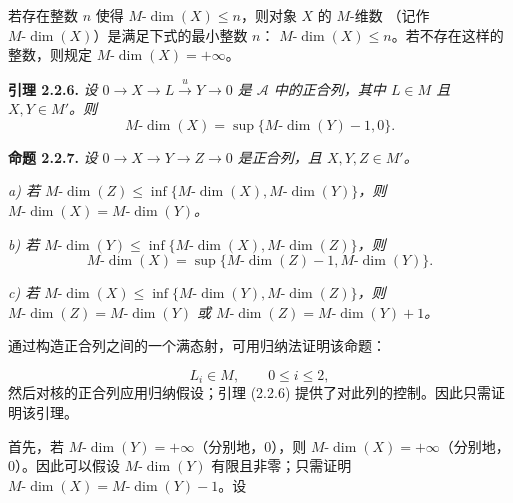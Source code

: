\clearpage
{}%
\begingroup\small\setlength{\parskip}{0pt}\setlength{\emergencystretch}{1.5em}
\setlength{\abovedisplayskip}{4pt plus 2pt minus 2pt}%
\setlength{\belowdisplayskip}{4pt plus 2pt minus 2pt}%

若存在整数 $n$ 使得 $M\text{-}\dim(X)\leq n$，则对象 $X$ 的 $M$-维数
（记作 $M\text{-}\dim(X)$）是满足下式的最小整数 $n$：
$M\text{-}\dim(X)\leq n$。若不存在这样的整数，则规定
$M\text{-}\dim(X)=+\infty$。

\medskip\noindent\textbf{引理 2.2.6.}\quad
\textit{设
$0\longrightarrow X\longrightarrow L\xrightarrow{u}Y\longrightarrow0$
是 $\mathcal A$ 中的正合列，其中 $L\in M$ 且 $X,Y\in M'$。则}
\[
M\text{-}\dim(X)=\sup\{M\text{-}\dim(Y)-1,0\}.
\]

\medskip\noindent\textbf{命题 2.2.7.}\quad
\textit{设
$0\longrightarrow X\longrightarrow Y\longrightarrow Z\longrightarrow0$
是正合列，且 $X,Y,Z\in M'$。}

\noindent\textit{a) 若
$M\text{-}\dim(Z)\leq
\inf\{M\text{-}\dim(X),M\text{-}\dim(Y)\}$，则
$M\text{-}\dim(X)=M\text{-}\dim(Y)$。}

\noindent\textit{b) 若
$M\text{-}\dim(Y)\leq
\inf\{M\text{-}\dim(X),M\text{-}\dim(Z)\}$，则}
\[
M\text{-}\dim(X)=
\sup\{M\text{-}\dim(Z)-1,M\text{-}\dim(Y)\}.
\]

\noindent\textit{c) 若
$M\text{-}\dim(X)\leq
\inf\{M\text{-}\dim(Y),M\text{-}\dim(Z)\}$，则
$M\text{-}\dim(Z)=M\text{-}\dim(Y)$ 或
$M\text{-}\dim(Z)=M\text{-}\dim(Y)+1$。}

通过构造正合列之间的一个满态射，可用归纳法证明该命题：

\begin{center}
\end{center}
\[
L_i\in M,\qquad 0\leq i\leq2,
\]
然后对核的正合列应用归纳假设；引理 (2.2.6) 提供了对此列的控制。因此只需证明该引理。

首先，若 $M\text{-}\dim(Y)=+\infty$（分别地，$0$），则
$M\text{-}\dim(X)=+\infty$（分别地，$0$）。因此可以假设
$M\text{-}\dim(Y)$ 有限且非零；只需证明
$M\text{-}\dim(X)=M\text{-}\dim(Y)-1$。设

